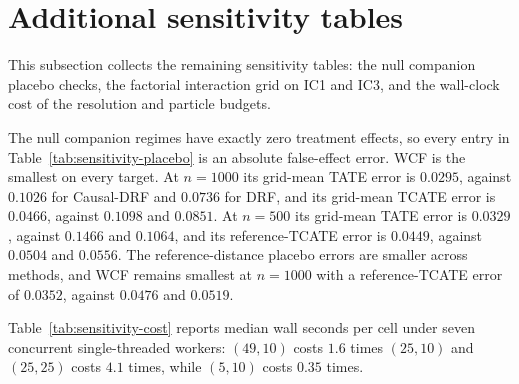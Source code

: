 \section{Additional sensitivity tables}\label{app:sensitivity-tables}

This subsection collects the remaining sensitivity tables: the null companion placebo checks, the factorial interaction grid on IC1 and IC3, and the wall-clock cost of the resolution and particle budgets.





The null companion regimes have exactly zero treatment effects, so every entry in Table~\ref{tab:sensitivity-placebo} is an absolute false-effect error. WCF is the smallest on every target. At $n=1000$ its grid-mean TATE error is $0.0295$, against $0.1026$ for Causal-DRF and $0.0736$ for DRF, and its grid-mean TCATE error is $0.0466$, against $0.1098$ and $0.0851$. At $n=500$ its grid-mean TATE error is $0.0329$, against $0.1466$ and $0.1064$, and its reference-TCATE error is $0.0449$, against $0.0504$ and $0.0556$. The reference-distance placebo errors are smaller across methods, and WCF remains smallest at $n=1000$ with a reference-TCATE error of $0.0352$, against $0.0476$ and $0.0519$.

Table~\ref{tab:sensitivity-cost} reports median wall seconds per cell under seven concurrent single-threaded workers: $(49,10)$ costs $1.6$ times $(25,10)$ and $(25,25)$ costs $4.1$ times, while $(5,10)$ costs $0.35$ times.
